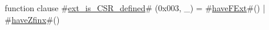function clause #\hyperref[sailRISCVzextzyiszyCSRzydefined]{ext\_is\_CSR\_defined}# (0x003, _) = #\hyperref[sailRISCVzhaveFExt]{haveFExt}#() | #\hyperref[sailRISCVzhaveZfinx]{haveZfinx}#()
